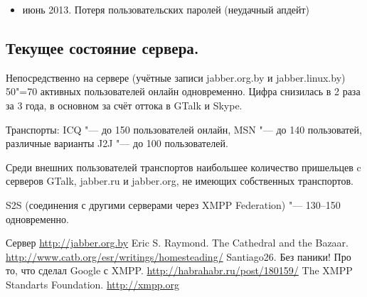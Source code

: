 \documentclass[10pt, a5paper]{article}
\begin{document}
\begin{itemize}
  \item июнь 2013. Потеря пользовательских паролей (неудачный апдейт)
\end{itemize}

\subsection{Текущее состояние сервера.}

Непосредственно на сервере (учётные записи jabber.org.by и jabber.linux.by) 50"=70 активных пользователей онлайн одновременно. Цифра снизилась в 2 раза за 3 года, в основном за счёт оттока в GTalk и Skype.

Транспорты: ICQ "--- до 150 пользователей онлайн, MSN "--- до 140 пользоватей, различные варианты J2J "--- до 100 пользователей.

Среди внешних пользователей транспортов наибольшее количество пришельцев  c серверов GTalk, jabber.ru и jabber.org, не имеющих собственных транспортов.

S2S (соединения с другими серверами через XMPP Federation) "--- 130--150 одновременно.


\begin{thebibliography}{9}

   Сервер \url{http://jabber.org.by}
   Eric S. Raymond. The Cathedral and the Bazaar. \url{http://www.catb.org/esr/writings/homesteading/}
   Santiago26. Без паники! Про то, что сделал Google с XMPP. \url{http://habrahabr.ru/post/180159/}
   The XMPP Standarts Foundation. \url{http://xmpp.org}
\end{thebibliography}
\end{document}
